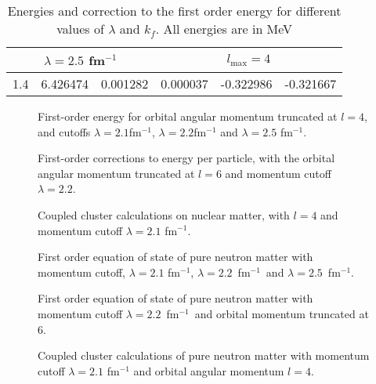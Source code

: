 \begin{table}
\begin{tabular}{|c|c|c|c|c|c|}
				\hline
				\multicolumn{3}{|c|}{$\lambda=2.5$ fm$^{-1}$}& \multicolumn{3}{c|}{$l_{\mbox{max}}=4$ }\\
				\hline
				1.4 & 6.426474 & 0.001282 & 0.000037 & -0.322986 & -0.321667\\
				\hline
		\end{tabular}
		\caption{Energies and correction to the first order energy for different values of $\lambda$ and $k_f$. All energies are in MeV}
		\label{tab:korreksjoner}
\end{table}
\begin{figure}[htpb]
		
		\caption{First-order energy for orbital angular momentum truncated at $l=4$, 
and cutoffs  $\lambda=2.1$fm$^{-1}$, $\lambda=2.2$fm$^{-1}$ and $\lambda=2.5$ fm$^{-1}$.}
		\label{fig:hf21}
\end{figure}
%		
\begin{figure}[htpb]
		
		\caption{First-order corrections to energy per particle, with the orbital angular momentum truncated at $l=6$ and momentum cutoff $\lambda=2.2$.}
		\label{fig:hf23}
\end{figure}
\begin{figure}

\caption{Coupled cluster calculations on nuclear matter, with $l=4$ and momentum cutoff $\lambda=2.1$ fm$^{-1}$.}
\label{fig:ccm_nucl_4_21}
\end{figure}
\begin{figure}

\caption{First order equation of state of pure neutron matter with momentum cutoff, $\lambda=2.1$ fm$^{-1}$, $\lambda=2.2$~fm$^{-1}$~and $\lambda=2.5$~fm$^{-1}$.}
\label{fig:first_neutron_l4}
\end{figure}
\begin{figure}

\caption{First order equation of state of pure neutron matter with momentum cutoff $\lambda=2.2$~fm$^{-1}$~and orbital momentum truncated at 6.}
\label{fig:first_neutron_l6}
\end{figure}
%
\begin{figure}

\caption{Coupled cluster calculations of pure neutron matter with momentum cutoff $\lambda=2.1$ fm$^{-1}$ and orbital angular momentum $l=4$.}
\label{fig:ccm_net_4_21}
\end{figure}




